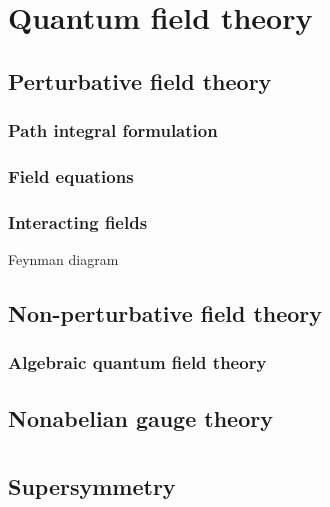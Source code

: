 \documentclass{../../large}
\begin{document}
\part{Quantum field theory}
\chapter{Perturbative field theory}
\section{Path integral formulation}
\section{Field equations}
\section{Interacting fields}
Feynman diagram

\chapter{Non-perturbative field theory}
\section{Algebraic quantum field theory}

\chapter{Nonabelian gauge theory}





\part{}
\chapter{Supersymmetry}
\end{document}
